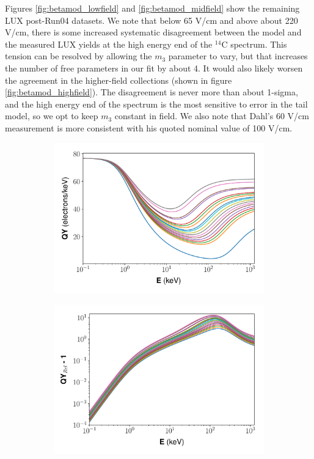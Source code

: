 Figures \ref{fig:betamod_lowfield} and \ref{fig:betamod_midfield} show the remaining LUX post-Run04 datasets. We note that below 65 V/cm and above about 220 V/cm, there is some increased systematic disagreement between the model and the measured LUX yields at the high energy end of the $^{14}$C spectrum. This tension can be resolved by allowing the $m_3$ parameter to vary, but that increases the number of free parameters in our fit by about 4. It would also likely worsen the agreement in the higher-field collections (shown in figure \ref{fig:betamod_highfield}). The disagreement is never more than about 1-sigma, and the high energy end of the spectrum is the most sensitive to error in the tail model, so we opt to keep $m_3$ constant in field. We also note that Dahl's 60 V/cm measurement is more consistent with his quoted nominal value of 100 V/cm.
\begin{figure}[!h]
\centering
\begin{subfigure}{0.5\linewidth}
\includegraphics[width=\linewidth]{Figures/Yields_fit_new/NEST_fit_fieldvar_new.pdf}
\caption{}
\end{subfigure}%
\begin{subfigure}{0.5\linewidth}
\includegraphics[width=\linewidth]{Figures/Yields_fit_new/NEST_fit_fieldvar_new_rel.pdf}

\end{subfigure}
\end{figure}
